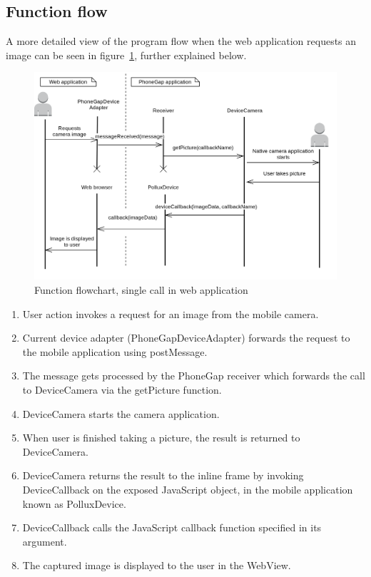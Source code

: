\subsection{Function flow}\label{subsec:function-flow-phonegap}
A more detailed view of the program flow when the web application requests an image can be seen in figure~\ref{fig:phonegapflow}, further explained below.
\begin{figure}[h!]
	\centering
    \includegraphics[width=120mm,natwidth=800,natheight=600]{./img/phonegapfunctionflow.png}
    \caption{Function flowchart, single call in web application \label{fig:phonegapflow}}
\end{figure}
\begin{enumerate}
	\item User action invokes a request for an image from the mobile camera. 
	\item Current device adapter (PhoneGapDeviceAdapter) forwards the request to the mobile application using postMessage.
	\item The message gets processed by the PhoneGap receiver which forwards the call to DeviceCamera via the getPicture function.
	\item DeviceCamera starts the camera application.
	\item When user is finished taking a picture, the result is returned to DeviceCamera.
	\item DeviceCamera returns the result to the inline frame by invoking DeviceCallback on the exposed JavaScript object, in the mobile application known as PolluxDevice.
	\item DeviceCallback calls the JavaScript callback function specified in its argument.
	\item The captured image is displayed to the user in the WebView.
\end{enumerate}


